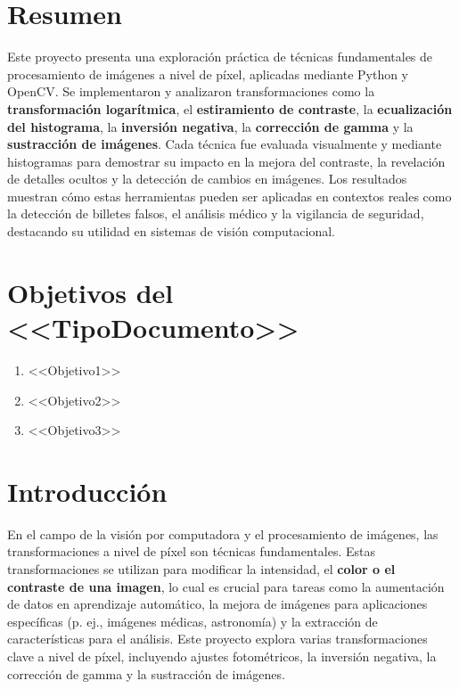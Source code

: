 \documentclass[12pt,letterpaper]{article}
\begin{document}
\setcounter{page}{1} %

\section*{Resumen}

Este proyecto presenta una exploración práctica de técnicas fundamentales de procesamiento de imágenes a nivel de píxel, aplicadas mediante Python y OpenCV. Se implementaron y analizaron transformaciones como la \textbf{transformación logarítmica}, el \textbf{estiramiento de contraste}, la \textbf{ecualización del histograma}, la \textbf{inversión negativa}, la \textbf{corrección de gamma} y la \textbf{sustracción de imágenes}. Cada técnica fue evaluada visualmente y mediante histogramas para demostrar su impacto en la mejora del contraste, la revelación de detalles ocultos y la detección de cambios en imágenes. Los resultados muestran cómo estas herramientas pueden ser aplicadas en contextos reales como la detección de billetes falsos, el análisis médico y la vigilancia de seguridad, destacando su utilidad en sistemas de visión computacional.
\section*{Objetivos del <<TipoDocumento>>}

\begin{enumerate}
  \item <<Objetivo1>>
  \item <<Objetivo2>>
  \item <<Objetivo3>>
\end{enumerate}

\newpage

\tableofcontents
\newpage

\listoffigures
\newpage

\section{Introducción}

En el campo de la visión por computadora y el procesamiento de imágenes, las transformaciones a nivel de píxel son técnicas fundamentales. Estas transformaciones se utilizan para modificar la intensidad, el \textbf{color o el contraste de una imagen}, lo cual es crucial para tareas como la aumentación de datos en aprendizaje automático, la mejora de imágenes para aplicaciones específicas (p. ej., imágenes médicas, astronomía) y la extracción de características para el análisis. Este proyecto explora varias transformaciones clave a nivel de píxel, incluyendo ajustes fotométricos, la inversión negativa, la corrección de gamma y la sustracción de imágenes.
\end{document}

